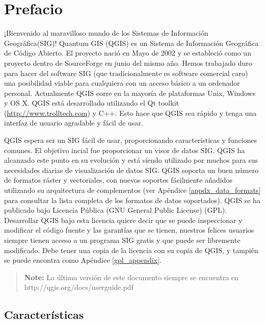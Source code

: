
\section{Prefacio}\label{label_forward}
\setcounter{page}{1}

¡Bienvenido al maravilloso mundo de los Sistemas de Información Geográfica(SIG)!
Quantum GIS (QGIS) es un Sistema de Información Geográfica de Código Abierto. 
El proyecto nació en Mayo de 2002 y se estableció como un proyecto dentro de 
SourceForge en junio del mismo año. Hemos trabajado duro para hacer del 
software SIG (que tradicionalmente es software comercial caro) una posibilidad
viable para cualquiera con un acceso básico a un ordenador personal. 
Actualmente QGIS corre en la mayoría de plataformas Unix, Windows y OS X. 
QGIS está desarrollado utilizando el Qt toolkit (\url{http://www.trolltech.com})
y C++. Esto hace que QGIS sea rápido y tenga una interfaz de usuario agradable
y fácil de usar.

QGIS espera ser un SIG fácil de usar, proporcionando características y 
funciones comunes. El objetivo incial fue proporcionar un visor de datos SIG. 
QGIS ha alcanzado este punto en su evolución y está siendo utilizado por muchos 
para sus necesidades diarias de visualización de datos SIG. QGIS soporta un 
buen número de formatos ráster y vectoriales, con nuevos soportes fácilmente
añadidos utilizando su arquitectura de complementos (ver Apéndice \ref{appdx_data_formats} 
para consultar la lista completa de los formatos de datos soportados).
QGIS se ha publicado bajo Licencia Pública (GNU General Public License) (GPL). 
Desarrollar QGIS bajo esta licencia quiere decir que se puede inspeccionar y 
modificar el código fuente y las garantías que se tienen, nuestros felices 
usuarios siempre tienen acceso a un programa SIG gratis y que puede ser 
libremente modificado. Debe tener una copia de la licencia con su copia 
de QGIS, y tampién se puede encontra como Apéndice \ref{gpl_appendix}.  

\begin{quote}
\begin{center}
\textbf{Note:} La última versión de este documento siempre se encuentra en \newline
http://qgis.org/docs/userguide.pdf 
\end{center}
\end{quote}

\subsection{Características}\label{label_majfeat}

